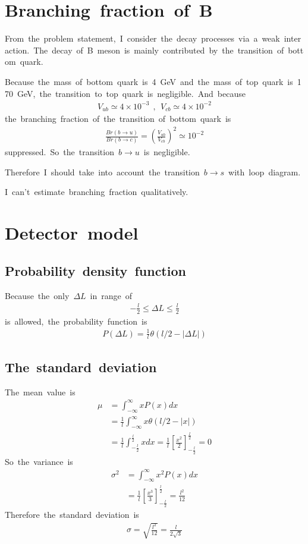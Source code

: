 \section{Branching\ fraction\ of\ B}
From\ the\ problem\ statement,\ I\ consider\ the\ decay\ processes\ via\ a\ weak\ interaction.\ The\ decay\ of\ B\ meson\ is\ mainly\ contributed\ by\ the\ transition\ of\ bottom\ quark.

Because\ the\ mass\ of\ bottom\ quark\ is\ 4\ GeV\ and\ the\ mass\ of\ top\ quark\ is\ 170\ GeV,\ the\ transition\ to\ top\ quark\ is\ negligible.\ And\ because
\begin{align*}
    V_{ub}\simeq4\times10^{-3}\ \ ,\ \ V_{cb}\simeq4\times10^{-2}
\end{align*}
the\ branching\ fraction\ of\ the\ transition\ of\ bottom\ quark\ is
\begin{align*}
    \frac{Br(b\to u)}{Br(b\to c)}=\left(\frac{V_{ub}}{V_{cb}}\right)^2\simeq10^{-2}
\end{align*}
suppressed.\ So\ the\ transition\ $b\to u$\ is\ negligible.

Therefore\ I\ should\ take\ into\ account\ the\ transition\ $b\to s$\ with\ loop\ diagram.

I\ can't\ estimate\ branching\ fraction\ qualitatively.

\section{Detector\ model}
\subsection{Probability\ density\ function}
Because\ the\ only\ $\Delta L$\ in\ range\ of\ 
\begin{align*}
    -\frac{l}{2}\leq\Delta L\leq\frac{l}{2}
\end{align*}
is\ allowed,\ the\ probability\ function\ is
\begin{align}
    P(\Delta L)=\frac{1}{l}\theta(l/2-|\Delta L|)
\end{align}
\subsection{The\ standard\ deviation}
The\ mean\ value\ is
\begin{align*}
    \mu&=\int^{\infty}_{-\infty}xP(x)dx\\
    &=\frac{1}{l}\int^{\infty}_{-\infty}x\theta(l/2-|x|)\\
    &=\frac{1}{l}\int^{\frac{l}{2}}_{-\frac{l}{2}}xdx=\frac{1}{l}\left[\frac{x^2}{2}\right]^{\frac{l}{2}}_{-\frac{l}{2}}=0
\end{align*}
So\ the\ variance\ is
\begin{align*}
    \sigma^2&=\int^{\infty}_{-\infty}x^2P(x)dx\\
    &=\frac{1}{l}\left[\frac{x^3}{3}\right]^{\frac{l}{2}}_{-\frac{l}{2}}=\frac{l^2}{12}
\end{align*}
Therefore\ the\ standard\ deviation\ is
\begin{align}
    \sigma=\sqrt{\frac{l^2}{12}}=\frac{l}{2\sqrt{3}}
\end{align}

